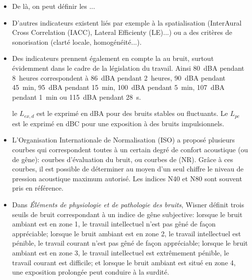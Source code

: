 \begin{itemize}
   \item De là, on peut définir les ...
   
   \item D'autres indicateurs existent liés par exemple à la spatialisation (InterAural Cross Correlation (IACC), Lateral Efficienty (LE)...) ou a des critères de sonorisation (clarté locale, homogénéité...).
   
   \item Des indicateurs prennent également en compte la  au bruit, surtout évidemment dans le cadre de la législation du travail.
    Ainsi 80~dBA pendant 8~heures correspondent à 86~dBA pendant 2~heures, 90~dBA pendant 45~min, 95~dBA pendant 15~min, 100~dBA pendant 5~min, 107~dBA pendant 1~min ou 115~dBA pendant 28~s.
    
    le $L_{ex,d}$ est le  exprimé en dBA pour des bruits stables ou fluctuants.
    Le $L_{pc}$ est le  exprimé en dBC pour une exposition à des bruits impulsionnels.
    

   \item L'Organisation Internationale de Normalisation (ISO) a proposé plusieurs courbes qui correspondent toutes à un certain degré de confort acoustique (ou de gêne): courbes d'évaluation du bruit, ou courbes de  (NR). Grâce à ces courbes, il est possible de déterminer au moyen d'un seul chiffre le niveau de pression acoustique maximum autorisé. Les indices N40 et N80 sont souvent pris en référence.

   \item Dans \emph{Éléments de physiologie et de pathologie des bruits}, Wisner définit trois seuils de bruit correspondant à un indice de gêne subjective: lorsque le bruit ambiant est en zone 1, le travail intellectuel n'est pas gêné de façon appréciable; lorsque le bruit ambiant est en zone 2, le travail intellectuel est pénible, le travail courant n'est pas gêné de façon appréciable; lorsque le bruit ambiant est en zone 3, le travail intellectuel est extrêmement pénible, le travail courant est difficile; et lorsque le bruit ambiant est situé en zone 4, une exposition prolongée peut conduire à la surdité.


\end{itemize}
